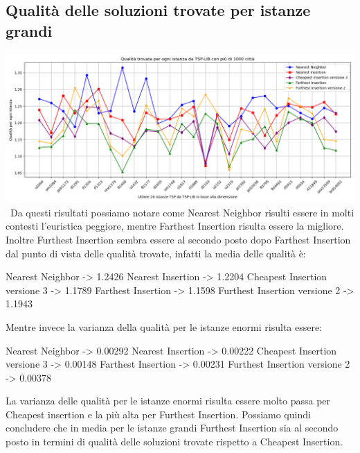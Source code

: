 \documentclass[a4paper,12pt]{report}
\begin{document}
\subsection{Qualità delle soluzioni trovate per istanze grandi}
\includegraphics[width=1\textwidth]{../Grafici/18.png} \
Da questi risultati possiamo notare come Nearest Neighbor risulti essere in molti contesti l'euristica peggiore, mentre Farthest Insertion risulta essere la migliore. Inoltre Furthest Insertion sembra essere al secondo posto dopo Farthest Insertion dal punto di vista delle qualità trovate, infatti la media delle qualità è:
\begin{myverbatim}
Nearest Neighbor ->              1.2426
Nearest Insertion ->             1.2204
Cheapest Insertion versione 3 -> 1.1789
Farthest Insertion ->            1.1598
Furthest Insertion versione 2 -> 1.1943
\end{myverbatim}
Mentre invece la varianza della qualità per le istanze enormi risulta essere:
\begin{myverbatim}
Nearest Neighbor ->              0.00292
Nearest Insertion ->             0.00222
Cheapest Insertion versione 3 -> 0.00148
Farthest Insertion ->            0.00231
Furthest Insertion versione 2 -> 0.00378  
\end{myverbatim}
La varianza delle qualità per le istanze enormi risulta essere molto passa per Cheapest insertion e la più alta per Furthest Insertion. \newline
Possiamo quindi concludere che in media per le istanze grandi Furthest Insertion sia al secondo posto in termini di qualità delle soluzioni trovate rispetto a Cheapest Insertion.
\end{document}
